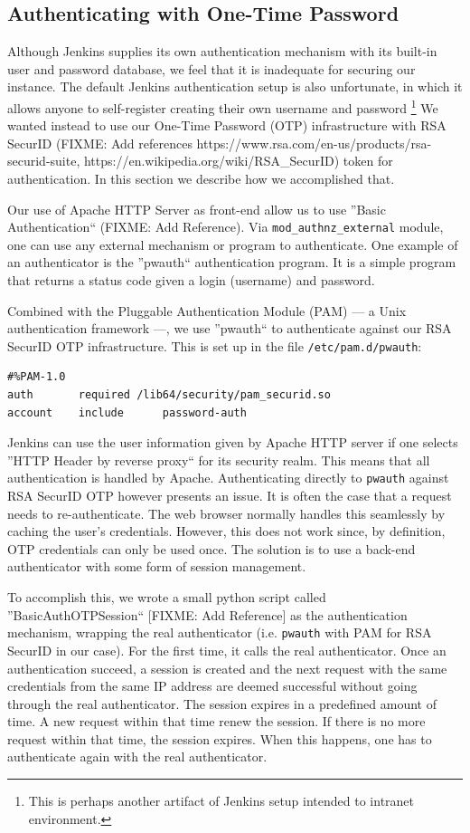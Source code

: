 \documentclass[10pt, conference, compsocconf]{IEEEtran}
\begin{document}
\subsection{Authenticating with One-Time Password}

Although Jenkins supplies its own authentication mechanism with its built-in user and password database, we feel that it is inadequate for securing our instance. 
The default Jenkins authentication setup is also unfortunate, in which it allows anyone to self-register creating their own username and password \footnote{This is perhaps another artifact of Jenkins setup intended to intranet environment.} 
We wanted instead to use our One-Time Password (OTP) infrastructure with RSA SecurID (FIXME: Add references https://www.rsa.com/en-us/products/rsa-securid-suite, https://en.wikipedia.org/wiki/RSA_SecurID) token for authentication. 
In this section we describe how we accomplished that.

Our use of Apache HTTP Server as front-end allow us to use ''Basic Authentication`` (FIXME: Add Reference). Via \texttt{mod_authnz_external} module, one can use any external mechanism or program to authenticate. 
One example of an authenticator is the ''pwauth`` authentication program. 
It is a simple program that returns a status code given a login (username) and password. 

Combined with the Pluggable Authentication Module (PAM) --- a Unix authentication framework ---, we use ''pwauth`` to authenticate against our RSA SecurID OTP infrastructure. 
This is set up in the file \texttt{/etc/pam.d/pwauth}:
\begin{lstlisting}
#%PAM-1.0
auth	   required	/lib64/security/pam_securid.so
account    include      password-auth
\end{lstlisting}

Jenkins can use the user information given by Apache HTTP server if one selects ''HTTP Header by reverse proxy`` for its security realm. 
This means that all authentication is handled by Apache. 
Authenticating directly to \texttt{pwauth} against RSA SecurID OTP however presents an issue. 
It is often the case that a request needs to re-authenticate. 
The web browser normally handles this seamlessly by caching the user's credentials.
However, this does not work since, by definition, OTP credentials can only be used once. 
The solution is to use a back-end authenticator with some form of session management. 

To accomplish this, we wrote a small python script called ''BasicAuthOTPSession`` [FIXME: Add Reference] as the authentication mechanism, wrapping the real authenticator (i.e. \texttt{pwauth} with PAM for RSA SecurID in our case). 
For the first time, it calls the real authenticator. 
Once an authentication succeed, a session is created and the next request with the same credentials from the same IP address are deemed successful without going through the real authenticator. 
The session expires in a predefined amount of time. 
A new request within that time renew the session. 
If there is no more request within that time, the session expires.
When this happens, one has to authenticate again with the real authenticator. 
\end{document}
